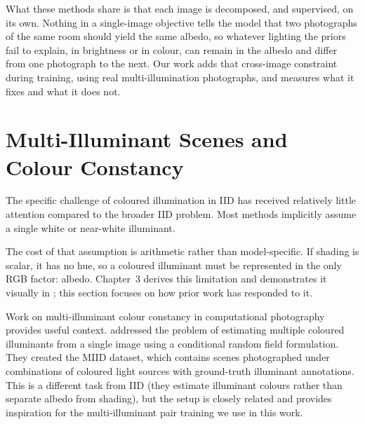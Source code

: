 What these methods share is that each image is decomposed, and supervised, on its own.
Nothing in a single-image objective tells the model that two photographs of the same
room should yield the same albedo, so whatever lighting the priors fail to explain, in
brightness or in colour, can remain in the albedo and differ from one photograph to the
next. Our work adds that cross-image constraint during training, using real
multi-illumination photographs, and measures what it fixes and what it does not.


\section{Multi-Illuminant Scenes and Colour Constancy}
\label{sec:multiillum}

The specific challenge of coloured illumination in IID has received relatively
little attention compared to the broader IID problem.
Most methods implicitly assume a single white or near-white illuminant.

The cost of that assumption is arithmetic rather than model-specific. If shading
is scalar, it has no hue, so a coloured illuminant must be represented in the
only RGB factor: albedo. Chapter~3 derives this limitation and demonstrates it
visually in ; this section focuses on how prior work has
responded to it.

Work on multi-illuminant colour constancy in computational photography provides
useful context.
 addressed the problem of estimating multiple coloured
illuminants from a single image using a conditional random field formulation.
They created the MIID dataset, which contains scenes photographed under combinations
of coloured light sources with ground-truth illuminant annotations.
This is a different task from IID (they estimate illuminant colours rather than
separate albedo from shading), but the setup is closely related and provides
inspiration for the multi-illuminant pair training we use in this work.

